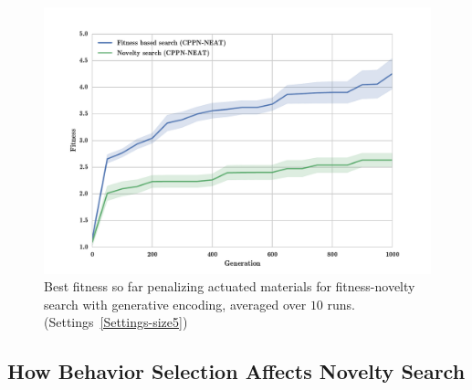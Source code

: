 \begin{figure}[t!]
\centering
\includegraphics[width=1.0\textwidth]{../Figures/Results/FitNovSize5Pen2.pdf}
\caption[]{Best fitness so far penalizing actuated materials for fitness-novelty search with generative encoding, averaged over $10$ runs. (Settings~\ref{Settings-size5})}
\label{fig:FitNovSize5Pen2}
\end{figure}

\subsection{How Behavior Selection Affects Novelty Search}

